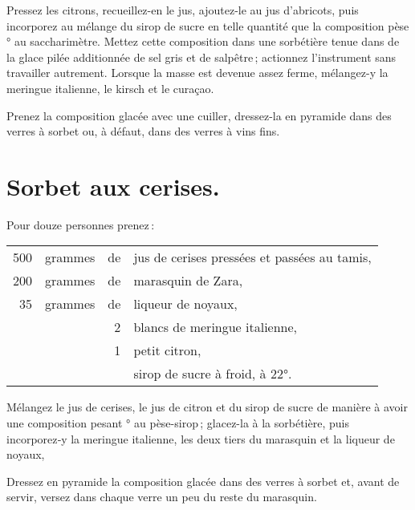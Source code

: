 Pressez les citrons, recueillez-en le jus, ajoutez-le au jus d'abricots, puis
incorporez au mélange du sirop de sucre en telle quantité que la composition
pèse {\mmm}° au saccharimètre. Mettez cette composition dans une
sorbétière tenue dans de la glace pilée additionnée de sel gris et de
salpêtre ; actionnez l'instrument sans travailler autrement. Lorsque la masse
est devenue assez ferme, mélangez-y la meringue italienne, le kirsch et le
curaçao.

Prenez la composition glacée avec une cuiller, dressez-la en pyramide dans des
verres à sorbet ou, à défaut, dans des verres à vins fins.

\section*{\centering Sorbet aux cerises.}
{}

Pour douze personnes prenez :

\footnotesize
\begin{longtable}{rrrp{16em}}
    500 & grammes & de & jus de cerises pressées et passées au tamis,                                     \\
    200 & grammes & de & marasquin de Zara,                                                               \\
     35 & grammes & de & liqueur de noyaux,                                                               \\
        &         &  2 & blancs de meringue italienne,                                                    \\
        &         &  1 & petit citron,                                                                    \\
        &         &    & sirop de sucre à froid, à 22°.                                                   \\
\end{longtable}
\normalsize

Mélangez le jus de cerises, le jus de citron et du sirop de sucre de manière
à avoir une composition pesant {\mmm}° au pèse-sirop ; glacez-la à la
sorbétière, puis incorporez‑y la meringue italienne, les deux tiers du
marasquin et la liqueur de noyaux,

Dressez en pyramide la composition glacée dans des verres à sorbet et, avant
de servir, versez dans chaque verre un peu du reste du marasquin.

